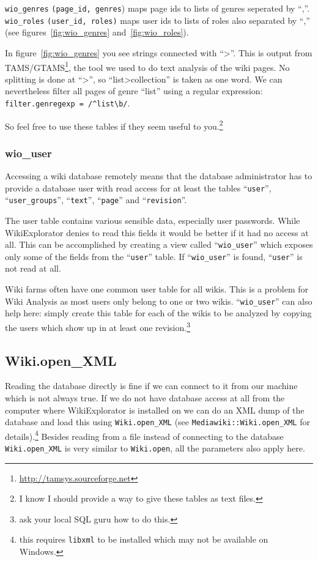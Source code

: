 \documentclass[a4paper]{scrartcl}
\newcommand{\file}[1]{\texttt{\color{file}#1}}
\newcommand{\code}[1]{\texttt{\color{code}#1}}
\newcommand{\cmd}[1]{\texttt{\color{cmd}#1}}
\newcommand{\rdoc}[1]{\texttt{\color{help}#1}}
\begin{document}
\code{wio\_genres} \code{(page\_id, genres}) maps
page ids to lists of genres seperated by ``,''. \code{wio\_roles}
\code{(user\_id, roles)} maps user ids to lists of roles also
separated by ``,'' (see figures~\ref{fig:wio_genres}
and~\ref{fig:wio_roles}).

In figure~\ref{fig:wio_genres} you see strings connected with
``>''. This is output from
TAMS/GTAMS\footnote{\url{http://tamsys.sourceforge.net}}, the tool we
used to do text analysis of the wiki pages. No splitting is done at
``>'', so ``list>collection'' is taken as one word. We can
nevertheless filter all pages of genre ``list'' using a regular
expression: \cmd{filter.genregexp = /\^{}list\textbackslash b/}.

So feel free to use these tables if they seem useful to
you.\footnote{I know I should provide a way to give these tables as
  text files.}

\subsubsection{wio\_user}
\label{sec:wio_user}

Accessing a wiki database remotely means that the database
administrator has to provide a database user with read access for at
least the tables ``\code{user}'', ``\code{user\_groups}'',
``\code{text}'', ``\code{page}'' and ``\code{revision}''.

The user table contains various sensible data, especially user
passwords. While WikiExplorator denies to read this fields it would be
better if it had no access at all. This can be accomplished by
creating a view called ``\code{wio\_user}'' which exposes only some of
the fields from the ``\code{user}'' table. If ``\code{wio\_user}'' is
found, ``\code{user}'' is not read at all.

\bigskip

Wiki farms often have one common user table for all wikis. This is a
problem for Wiki Analysis as most users only belong to one or two
wikis. ``\code{wio\_user}'' can also help here: simply create this
table for each of the wikis to be analyzed by copying the users which
show up in at least one revision.\footnote{ask your local SQL guru how
to do this.}

\subsection{Wiki.open\_XML}
\label{sec:Wiki.open_XML}

Reading the database directly is fine if we can connect to it from our
machine which is not always true.  If we do not have database
access at all from the computer where WikiExplorator is installed on
we can do an XML dump of the database and load this using
\cmd{Wiki.open\_XML} (see \rdoc{Mediawiki::Wiki.open\_XML} for
details).\footnote{this requires \file{libxml} to be installed which
  may not be available on Windows.} Besides reading from a file
instead of connecting to the database \cmd{Wiki.open\_XML} is very
similar to \cmd{Wiki.open}, all the parameters also apply here.
\end{document}
